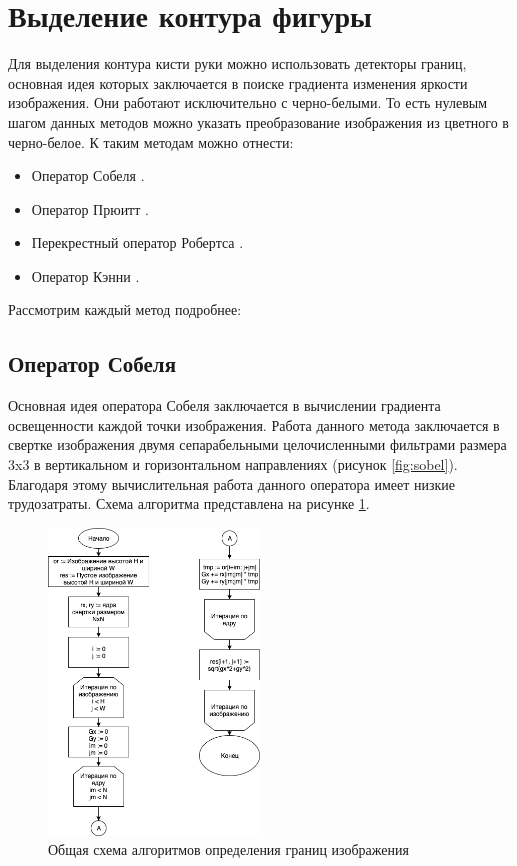 \section{Выделение контура фигуры}
\label{sec:Edge}

Для выделения контура кисти руки можно использовать детекторы границ, основная идея которых заключается в поиске градиента изменения яркости изображения. Они работают исключительно с черно-белыми. То есть нулевым шагом данных методов можно указать преобразование изображения из цветного в черно-белое. К таким методам можно отнести:

\begin{itemize}
	\item Оператор Собеля \cite{Sobel}.
	\item Оператор Прюитт \cite{Prewitt}.
	\item Перекрестный оператор Робертса \cite{Roberts}.
	\item Оператор Кэнни \cite{Canny}.
\end{itemize}

Рассмотрим каждый метод подробнее:

\subsection{Оператор Собеля}

Основная идея оператора Собеля\cite{Sobel} заключается в вычислении градиента освещенности каждой точки изображения. Работа данного метода заключается в  свертке изображения двумя сепарабельными целочисленными фильтрами размера 3x3 в вертикальном и горизонтальном направлениях (рисунок \ref{fig:sobel}). Благодаря этому вычислительная работа данного оператора имеет низкие трудозатраты. Схема алгоритма представлена на рисунке \ref{fig:sobel-block}.

\begin{figure}[!h]
	\centering
	\includegraphics[width=0.5\textwidth,keepaspectratio]{figures/ru/sobel-block.png}
	\caption{Общая схема алгоритмов определения границ изображения}
	\label{fig:sobel-block}
\end{figure}

